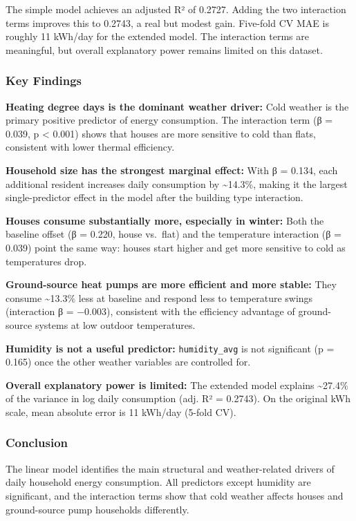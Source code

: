 \documentclass[
]{article}
\begin{document}
The simple model achieves an adjusted R² of 0.2727. Adding the two
interaction terms improves this to 0.2743, a real but modest gain.
Five-fold CV MAE is roughly 11 kWh/day for the extended model. The
interaction terms are meaningful, but overall explanatory power remains
limited on this dataset.

\subsubsection{Key Findings}\label{key-findings}

\textbf{Heating degree days is the dominant weather driver:} Cold
weather is the primary positive predictor of energy consumption. The
interaction term (β = 0.039, p \textless{} 0.001) shows that houses are
more sensitive to cold than flats, consistent with lower thermal
efficiency.

\textbf{Household size has the strongest marginal effect:} With β =
0.134, each additional resident increases daily consumption by
\textasciitilde14.3\%, making it the largest single-predictor effect in
the model after the building type interaction.

\textbf{Houses consume substantially more, especially in winter:} Both
the baseline offset (β = 0.220, house vs.~flat) and the temperature
interaction (β = 0.039) point the same way: houses start higher and get
more sensitive to cold as temperatures drop.

\textbf{Ground-source heat pumps are more efficient and more stable:}
They consume \textasciitilde13.3\% less at baseline and respond less to
temperature swings (interaction β = −0.003), consistent with the
efficiency advantage of ground-source systems at low outdoor
temperatures.

\textbf{Humidity is not a useful predictor:} \texttt{humidity\_avg} is
not significant (p = 0.165) once the other weather variables are
controlled for.

\textbf{Overall explanatory power is limited:} The extended model
explains \textasciitilde27.4\% of the variance in log daily consumption
(adj. R² = 0.2743). On the original kWh scale, mean absolute error is 11
kWh/day (5-fold CV).

\subsubsection{Conclusion}\label{conclusion}

The linear model identifies the main structural and weather-related
drivers of daily household energy consumption. All predictors except
humidity are significant, and the interaction terms show that cold
weather affects houses and ground-source pump households differently.
\end{document}
